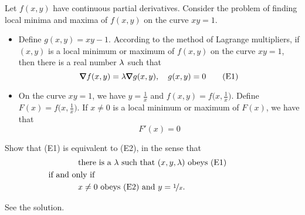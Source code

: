 \begin{question}
Let $f(x,y)$ have continuous partial derivatives. Consider the problem of 
finding local minima and maxima of $f(x,y)$ on the curve $xy=1$.
\begin{itemize}
\item
Define $g(x,y) = xy -1$.
According to the method of Lagrange multipliers, if $(x,y)$ is 
a local minimum or maximum of $f(x,y)$ on the curve $xy=1$, then there is a real number $\lambda$ such that
\begin{equation*}
\vnabla f(x,y) =\la \vnabla g(x,y),\quad g(x,y)=0
\tag{E1}\end{equation*}

\item
On the curve $xy=1$, we have 
$y=\frac{1}{x}$ and $f(x,y) =f\big(x,\frac{1}{x}\big)$. Define 
$F(x)=f\big(x,\frac{1}{x}\big)$. If $x\ne 0$ is a local minimum or maximum of 
$F(x)$, we have that
\begin{equation*}
F'(x)=0
\tag{E2}\end{equation*}
\end{itemize}
Show that (E1) is equivalent to (E2), in the sense that 
\begin{align*}
&\text{there is a $\la$ such that $(x,y,\la)$  obeys (E1)}\\
&\hskip-0.5in\text{if and only if}\\ 
&\text{$x\ne 0$ obeys (E2) and $y=\nicefrac{1}{x}$.}
\end{align*}
\end{question}

%

\begin{answer}
See the solution.
\end{answer}

